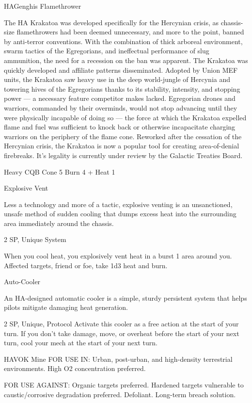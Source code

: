 \begin{mech}{HA}{Genghis}
Flamethrower

The HA Krakatoa was developed specifically for the Hercynian crisis, as chassis-size flamethrowers had been deemed unnecessary, and more to the point, banned by anti-terror conventions. With the combination of thick arboreal environment, swarm tactics of the Egregorians, and ineffectual performance of slug ammunition, the need for a recession on the ban was apparent. The Krakatoa was quickly developed and affiliate patterns disseminated. Adopted by Union MEF units, the Krakatoa saw heavy use in the deep world-jungle of Hercynia and towering hives of the Egregorians thanks to its stability, intensity, and stopping power — a necessary feature competitor makes lacked. Egregorian drones and warriors, commanded by their overminds, would not stop advancing until they were physically incapable of doing so — the force at which the Krakatoa expelled flame and fuel was sufficient to knock back or otherwise incapacitate charging warriors on the periphery of the flame cone. Reworked after the cessation of the Hercynian crisis, the Krakatoa is now a popular tool for creating area-of-denial firebreaks. It’s legality is currently under review by the Galactic Treaties Board.

Heavy CQB
Cone 5
Burn 4 + Heat 1

Explosive Vent

Less a technology and more of a tactic, explosive venting is an unsanctioned, unsafe method of sudden cooling that dumps excess heat into the surrounding area immediately around the chassis.

2 SP, Unique
System

When you cool heat, you explosively vent heat in a burst 1 area around you. Affected targets, friend or foe, take 1d3 heat and burn.


Auto-Cooler

An HA-designed automatic cooler is a simple, sturdy persistent system that helps pilots mitigate damaging heat generation.

2 SP, Unique, Protocol
Activate this cooler as a free action at the start of your turn. If you don’t take damage, move, or overheat before the start of your next turn, cool your mech at the start of your next turn.


HAVOK Mine
FOR USE IN: Urban, post-urban, and high-density terrestrial environments. High O2  concentration preferred.

FOR USE AGAINST: Organic targets preferred. Hardened targets vulnerable to caustic/corrosive degradation preferred. Defoliant. Long-term breach solution.


\end{mech}
